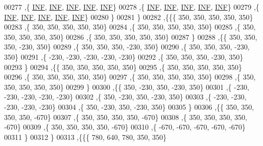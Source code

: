 \begin{DoxyCode}
00277    ,\{   \mbox{\hyperlink{1_88_84__epars_8h_a12c2040f25d8e3a7b9e1c2024c618cb6}{INF}},   \mbox{\hyperlink{1_88_84__epars_8h_a12c2040f25d8e3a7b9e1c2024c618cb6}{INF}},   \mbox{\hyperlink{1_88_84__epars_8h_a12c2040f25d8e3a7b9e1c2024c618cb6}{INF}},   \mbox{\hyperlink{1_88_84__epars_8h_a12c2040f25d8e3a7b9e1c2024c618cb6}{INF}},   \mbox{\hyperlink{1_88_84__epars_8h_a12c2040f25d8e3a7b9e1c2024c618cb6}{INF}}\}
00278    ,\{   \mbox{\hyperlink{1_88_84__epars_8h_a12c2040f25d8e3a7b9e1c2024c618cb6}{INF}},   \mbox{\hyperlink{1_88_84__epars_8h_a12c2040f25d8e3a7b9e1c2024c618cb6}{INF}},   \mbox{\hyperlink{1_88_84__epars_8h_a12c2040f25d8e3a7b9e1c2024c618cb6}{INF}},   \mbox{\hyperlink{1_88_84__epars_8h_a12c2040f25d8e3a7b9e1c2024c618cb6}{INF}},   \mbox{\hyperlink{1_88_84__epars_8h_a12c2040f25d8e3a7b9e1c2024c618cb6}{INF}}\}
00279    ,\{   \mbox{\hyperlink{1_88_84__epars_8h_a12c2040f25d8e3a7b9e1c2024c618cb6}{INF}},   \mbox{\hyperlink{1_88_84__epars_8h_a12c2040f25d8e3a7b9e1c2024c618cb6}{INF}},   \mbox{\hyperlink{1_88_84__epars_8h_a12c2040f25d8e3a7b9e1c2024c618cb6}{INF}},   \mbox{\hyperlink{1_88_84__epars_8h_a12c2040f25d8e3a7b9e1c2024c618cb6}{INF}},   \mbox{\hyperlink{1_88_84__epars_8h_a12c2040f25d8e3a7b9e1c2024c618cb6}{INF}}\}
00280    \}
00281   \}
00282  ,\{\{\{   350,   350,   350,   350,   350\}
00283    ,\{   350,   350,   350,   350,   350\}
00284    ,\{   350,   350,   350,   350,   350\}
00285    ,\{   350,   350,   350,   350,   350\}
00286    ,\{   350,   350,   350,   350,   350\}
00287    \}
00288   ,\{\{   350,   350,   350,  -230,   350\}
00289    ,\{   350,   350,   350,  -230,   350\}
00290    ,\{   350,   350,   350,  -230,   350\}
00291    ,\{  -230,  -230,  -230,  -230,  -230\}
00292    ,\{   350,   350,   350,  -230,   350\}
00293    \}
00294   ,\{\{   350,   350,   350,   350,   350\}
00295    ,\{   350,   350,   350,   350,   350\}
00296    ,\{   350,   350,   350,   350,   350\}
00297    ,\{   350,   350,   350,   350,   350\}
00298    ,\{   350,   350,   350,   350,   350\}
00299    \}
00300   ,\{\{   350,  -230,   350,  -230,   350\}
00301    ,\{  -230,  -230,  -230,  -230,  -230\}
00302    ,\{   350,  -230,   350,  -230,   350\}
00303    ,\{  -230,  -230,  -230,  -230,  -230\}
00304    ,\{   350,  -230,   350,  -230,   350\}
00305    \}
00306   ,\{\{   350,   350,   350,   350,  -670\}
00307    ,\{   350,   350,   350,   350,  -670\}
00308    ,\{   350,   350,   350,   350,  -670\}
00309    ,\{   350,   350,   350,   350,  -670\}
00310    ,\{  -670,  -670,  -670,  -670,  -670\}
00311    \}
00312   \}
00313  ,\{\{\{   780,   640,   780,   350,   350\}

\end{DoxyCode}
